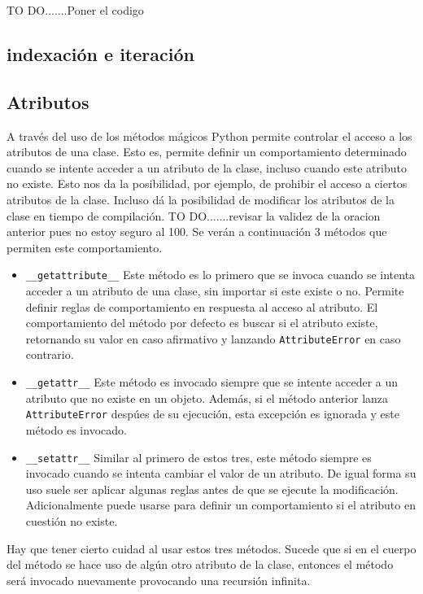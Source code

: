 \documentclass[10pt]{article}
\newcommand{\mgc}[1]{\texttt{\_\_#1\_\_}}
\newcommand{\csl}[1]{\texttt{#1}}
\newcommand{\todo}[1]{\color{red}TO DO.......#1\color{black}}
\begin{document}
\todo{Poner el codigo}

\subsection{indexaci\'on e iteraci\'on}

\subsection{Atributos}

A trav\'es del uso de los m\'etodos m\'agicos Python permite controlar el acceso a los atributos de una clase. Esto es, permite definir un comportamiento determinado cuando se intente acceder a un atributo de la clase, incluso cuando este atributo no existe. Esto nos da la posibilidad, por ejemplo, de prohibir el acceso a ciertos atributos de la clase. Incluso d\'a la posibilidad de modificar los atributos de la clase en tiempo de compilaci\'on. \todo{revisar la validez de la oracion anterior pues no estoy seguro al 100}. Se ver\'an a continuaci\'on 3  m\'etodos que permiten este comportamiento.

\begin{itemize}
	\item \mgc{getattribute} Este m\'etodo es lo primero que se invoca cuando se intenta acceder a un atributo de una clase, sin importar si este existe o no. Permite definir reglas de comportamiento en respuesta al acceso al atributo. El comportamiento del m\'etodo por defecto es buscar si el atributo existe, retornando su valor en caso afirmativo y lanzando \csl{AttributeError} en caso contrario.
	\item \mgc{getattr} Este m\'etodo es invocado siempre que se intente acceder a un atributo que no existe en un objeto. Adem\'as, si el m\'etodo anterior lanza \csl{AttributeError} desp\'ues de su ejecuci\'on, esta excepci\'on es ignorada y este m\'etodo es invocado. 
	\item \mgc{setattr} Similar al primero de estos tres, este m\'etodo siempre es invocado cuando se intenta cambiar el valor de un atributo. De igual forma su uso suele ser aplicar algunas reglas antes de que se ejecute la modificaci\'on. Adicionalmente puede usarse para definir un comportamiento si el atributo en cuesti\'on no existe.
\end{itemize}

Hay que tener cierto cuidad al usar estos tres m\'etodos. Sucede que si en el cuerpo del m\'etodo se hace uso de alg\'un otro atributo de la clase, entonces el m\'etodo ser\'a invocado nuevamente provocando una recursi\'on infinita.
\end{document}
